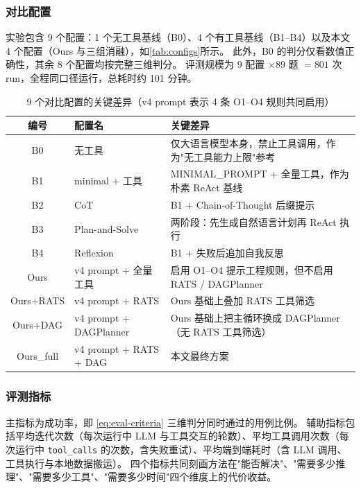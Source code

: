 \subsubsection{对比配置}

实验包含 9 个配置：1 个无工具基线（B0）、4 个有工具基线（B1--B4）以及本文 4 个配置（Ours 与三组消融），如\autoref{tab:configs}所示。
此外，B0 的判分仅看数值正确性，其余 8 个配置均按完整三维判分。
评测规模为 $9$ 配置 $\times 89$ 题 $= 801$ 次 run，全程同口径运行，总耗时约 101 分钟。

\begin{table}[htbp]
    \centering
    \caption{\label{tab:configs}9 个对比配置的关键差异（v4 prompt 表示 4 条 O1--O4 规则共同启用）}
    \begin{tabularx}{\linewidth}{clX}
        \toprule
        编号 & 配置名 & 关键差异 \\ \midrule
        B0 & 无工具 & 仅大语言模型本身，禁止工具调用，作为"无工具能力上限"参考 \\
        B1 & minimal + 工具 & MINIMAL\_PROMPT + 全量工具，作为朴素 ReAct 基线 \\
        B2 & CoT & B1 + Chain-of-Thought 后缀提示\cite{wei2022cot} \\
        B3 & Plan-and-Solve & 两阶段：先生成自然语言计划再 ReAct 执行\cite{wang2023plansolve} \\
        B4 & Reflexion & B1 + 失败后追加自我反思\cite{shinn2023reflexion} \\
        Ours & v4 prompt + 全量工具 & 启用 O1--O4 提示工程规则，但不启用 RATS / DAGPlanner \\
        Ours+RATS & v4 prompt + RATS & Ours 基础上叠加 RATS 工具筛选 \\
        Ours+DAG & v4 prompt + DAGPlanner & Ours 基础上把主循环换成 DAGPlanner（无 RATS 工具筛选） \\
        Ours\_full & v4 prompt + RATS + DAG & 本文最终方案 \\ \bottomrule
    \end{tabularx}
\end{table}

\subsubsection{评测指标}

主指标为成功率，即 \autoref{eq:eval-criteria} 三维判分同时通过的用例比例。
辅助指标包括平均迭代次数（每次运行中 LLM 与工具交互的轮数）、平均工具调用次数（每次运行中 \texttt{tool\_calls} 的次数，含失败重试）、平均端到端耗时（含 LLM 调用、工具执行与本地数据搬运）。
四个指标共同刻画方法在"能否解决"、"需要多少推理"、"需要多少工具"、"需要多少时间"四个维度上的代价收益。

